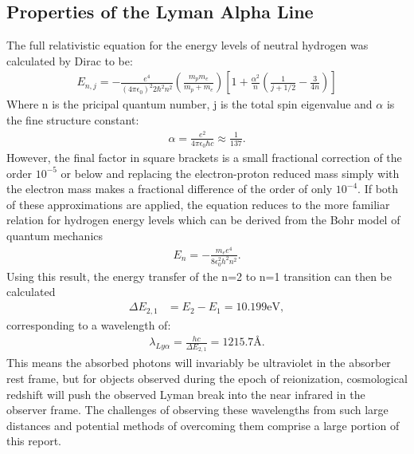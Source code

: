 	\subsection{Properties of the Lyman Alpha Line} %
	\label{sub:properties_of_the_lyman_alpha_line}
		The full relativistic equation for the energy levels of neutral hydrogen was calculated by Dirac to be\cite{EisbergResnick}:
		\begin{align}
			E_{n,j} = - \frac{e^4}{ (4 \pi \epsilon_0)^2 2 \hbar^2 n^2} \left( \frac{m_p m_e}{m_p + m_e} \right) %
				\left [ 1 + \frac{\alpha^2}{n} \left( \frac{1}{j+1/2} - \frac{3}{4n} \right) \right]
		\end{align}
		Where n is the pricipal quantum number, j is the total spin eigenvalue and $\alpha$ is the fine structure constant:
		\begin{align}
			\alpha = \frac{e^2}{4 \pi \epsilon_0 \hbar c}  \approx \frac{1}{137}.
		\end{align}
		However, the final factor in square brackets is a small fractional correction of the order $10^{-5}$ or below and replacing the electron-proton reduced mass simply with the electron mass makes a fractional difference of the order of only $10^{-4}$. If both of these approximations are applied, the equation reduces to the more familiar relation for hydrogen energy levels which can be derived from the Bohr model of quantum mechanics
		\begin{align}
			E_n = - \frac{m_e e^4}{8 \epsilon_0^2 h^2 n^2}.
		\end{align}
		Using this result, the energy transfer of the n=2 to n=1 transition can then be calculated
		\begin{align}
			\Delta E_{2,1} &= E_2 - E_1 = 10.199\si{\electronvolt} ,
		\end{align}
		corresponding to a wavelength of:
		\begin{align}
			\lambda_{Ly\alpha} = \frac{hc}{\Delta E_{2,1}} = 1215.7 \si{\angstrom}.
		\end{align}
		This means the absorbed photons will invariably be ultraviolet in the absorber rest frame, but for objects observed during the epoch of reionization, cosmological redshift will push the observed Lyman break into the near infrared in the observer frame. The challenges of observing these wavelengths from such large distances and potential methods of overcoming them comprise a large portion of this report.



